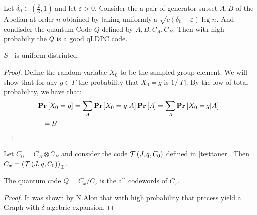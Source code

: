 \begin{theorem*} 
Let $\delta_{0} \in \left( \frac{2}{3} ,1 \right)$ and let $\varepsilon > 0$. Consider the a pair of generator subset $A,B$ of the Abelian at order $n$ obtained by taking uniformly a $ \sqrt{ c\left( \delta_{0} + \varepsilon \right)\log n }$. And condisder the quantum Code $Q$ defined by $A,B,C_{A},C_{B}$.  Then with high probabiliy the $Q$ is a good qLDPC code.
\end{theorem*}
\begin{claim} \label{unif}
  $S_{+}$ is uniform distriuted. 
\end{claim}
\begin{proof}
  Define the random variable $X_{0}$ to be the sampled group element. We will show that for any $g \in \Gamma $ the probability that $X_{0} = g$ is $1/|\Gamma|$. By the low of total probability, we have that:     
  \begin{equation*}
    \begin{split}
      & \mathbf{Pr} \left[ {X_{0} = g} \right] = \sum_{A}{ \mathbf{Pr} \left[ { X_{0} = g | A } \right] \mathbf{Pr} \left[ {A} \right]  } = \sum_{A}{ \mathbf{Pr} \left[ { X_{0} = g | A } \right] } \\ 
      & \ \ = B
    \end{split}
  \end{equation*}
\end{proof}
\begin{claim}
  Let $C_{0} = C_{A}\otimes C_{B}$ and consider the code $\mathcal{T}\left(J, q , C_{0}\right)$ defined in \ref{testtaner}. Then $C_{x} = \left( \mathcal{T}\left(J, q , C_{0}\right) \right)_{\oplus}$. 
\end{claim}
\begin{claim}
  The quantum code $Q = C_{x}/ C_{z}$ is the all \ireducable codewords of $C_{x}$.   
\end{claim}
\begin{proof}
  It was shown by N.Alon \cite{Noga}  that with high probability that process yield a Graph with $\delta$-algebric expansion.
  \end{proof}
